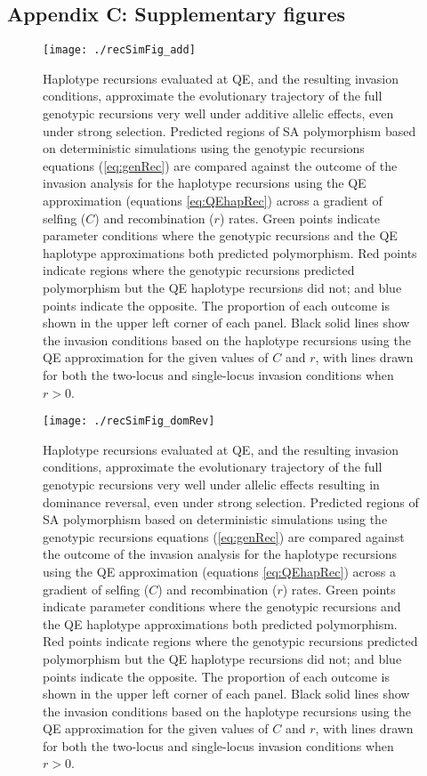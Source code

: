 \documentclass{article}
\begin{document}
\subsection*{Appendix C: Supplementary figures}
\renewcommand{\thefigure}{C\arabic{figure}}
\setcounter{figure}{0}
\newpage{}

\begin{figure}[H]
\texttt{[image: ./recSimFig\_add]}
\caption{Haplotype recursions evaluated at QE, and the resulting invasion conditions, approximate the evolutionary trajectory of the full genotypic recursions very well under additive allelic effects, even under strong selection. Predicted regions of SA polymorphism based on deterministic simulations using the genotypic recursions equations (\ref{eq:genRec}) are compared against the outcome of the invasion analysis for the haplotype recursions using the QE approximation (equations \ref{eq:QEhapRec}) across a gradient of selfing ($C$) and recombination ($r$) rates. Green points indicate parameter conditions where the genotypic recursions and the QE haplotype approximations both predicted polymorphism. Red points indicate regions where the genotypic recursions predicted polymorphism but the QE haplotype recursions did not; and blue points indicate the opposite. The proportion of each outcome is shown in the upper left corner of each panel. Black solid lines show the invasion conditions based on the haplotype recursions using the QE approximation for the given values of $C$ and $r$, with lines drawn for both the two-locus and single-locus invasion conditions when $r > 0$.}
\label{fig:addSim}
\end{figure}
\newpage{}


\begin{figure}[H] 
\texttt{[image: ./recSimFig\_domRev]}
\caption{Haplotype recursions evaluated at QE, and the resulting invasion conditions, approximate the evolutionary trajectory of the full genotypic recursions very well under allelic effects resulting in dominance reversal, even under strong selection. Predicted regions of SA polymorphism based on deterministic simulations using the genotypic recursions equations (\ref{eq:genRec}) are compared against the outcome of the invasion analysis for the haplotype recursions using the QE approximation (equations \ref{eq:QEhapRec}) across a gradient of selfing ($C$) and recombination ($r$) rates. Green points indicate parameter conditions where the genotypic recursions and the QE haplotype approximations both predicted polymorphism. Red points indicate regions where the genotypic recursions predicted polymorphism but the QE haplotype recursions did not; and blue points indicate the opposite. The proportion of each outcome is shown in the upper left corner of each panel. Black solid lines show the invasion conditions based on the haplotype recursions using the QE approximation for the given values of $C$ and $r$, with lines drawn for both the two-locus and single-locus invasion conditions when $r > 0$.}
\label{fig:domRevSim}
\end{figure}
\newpage{}
\end{document}
